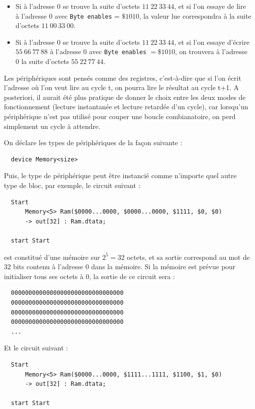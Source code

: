 \documentclass[13pt]{article}
\begin{document}
\begin{itemize}
\item   Si à l'adresse $0$ se trouve la suite d'octets $11\ 22\ 33\ 44$, et si l'on
    essaye de lire à l'adresse $0$ avec \texttt{Byte enables} = $\$1010$, la valeur lue
    correspondra à la suite d'octets $11\ 00\ 33\ 00$.

\item  Si à l'adresse $0$ se trouve la suite d'octets $11\ 22\ 33\ 44$, et si l'on
    essaye d'écrire $55\ 66\ 77\ 88$ à l'adresse $0$ avec \texttt{Byte enables} $= \$1010$,
    on trouvera à l'adresse $0$ la suite d'octets $55\ 22\ 77\ 44$.
\end{itemize}

Les périphériques sont pensés comme des registres, c'est-à-dire que si l'on
écrit l'adresse où l'on veut lire au cycle t, on pourra lire le résultat au
cycle t+1. A posteriori, il aurait été plus pratique de donner le choix
entre les deux modes de fonctionnement (lecture instantanée et lecture
retardée d'un cycle), car lorsqu'un périphérique n'est pas utilisé pour
couper une boucle combianatoire, on perd simplement un cycle à attendre.

On déclare les types de périphériques de la façon suivante :

\begin{verbatim}
  device Memory<size>
\end{verbatim}

Puis, le type de périphérique peut être instancié comme n'importe quel
autre type de bloc, par exemple, le circuit suivant :
\begin{verbatim}
  Start
      Memory<5> Ram($0000...0000, $0000...0000, $1111, $0, $0)
      -> out[32] : Ram.dtata;

  start Start
\end{verbatim}
est constitué d'une mémoire sur $2^5 = 32$ octets, et sa sortie correspond au
mot de $32$ bits contenu à l'adresse $0$ dans la mémoire. Si la mémoire est
prévue pour initialiser tous ses octets à $0$, la sortie de ce circuit sera :

\begin{verbatim}
  00000000000000000000000000000000
  00000000000000000000000000000000
  00000000000000000000000000000000
  00000000000000000000000000000000
  ...
\end{verbatim}

Et le circuit suivant :

\begin{verbatim}
  Start
      Memory<5> Ram($0000...0000, $1111...1111, $1100, $1, $0)
      -> out[32] : Ram.dtata;

  start Start
\end{verbatim}
\end{document}
